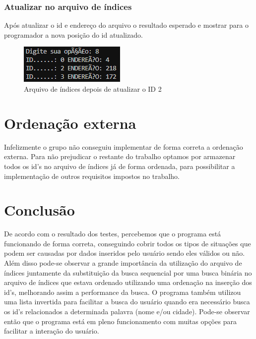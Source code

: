 \documentclass[12pt]{article}
\begin{document}
\subsubsection{Atualizar no arquivo de índices}
Após atualizar o id e endereço do arquivo o resultado esperado e mostrar para o programador a nova posição do id atualizado.

\begin{figure}[ht]
\centering
\includegraphics[width=.4\textwidth]{apos_update.png}
\caption{Arquivo de índices depois de atualizar o ID 2}
\label{fig:att_arq}
\end{figure}


\section{Ordenação externa}
Infelizmente o grupo não conseguiu implementar de forma correta a ordenação externa. Para não prejudicar o restante do trabalho optamos por armazenar todos os id's no arquivo de índices já de forma ordenada, para possibilitar a implementação de outros requisitos impostos no trabalho.
\section{Conclusão}
De acordo com o resultado dos testes, percebemos que o programa está funcionando  de forma correta, conseguindo cobrir todos os tipos de situações que podem ser causadas por dados inseridos pelo usuário sendo eles válidos ou não. Além disso pode-se observar a grande importância da utilização do arquivo de índices juntamente da substituição da busca sequencial por uma busca binária no arquivo de índices que estava ordenado utilizando uma ordenação na inserção dos id's, melhorando assim a performance da busca. O programa também utilizou uma lista invertida para facilitar a busca do usuário quando era necessário busca os id's relacionados a determinada palavra (nome e/ou cidade). Pode-se observar então que o programa está em pleno funcionamento com muitas opções para facilitar a interação do usuário.
\end{document}
